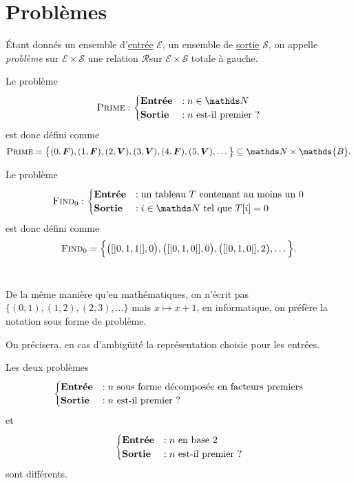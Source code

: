 \section{Problèmes}

\begin{defn}
	Étant donnés un ensemble d'\ul{entrée} $\mathcal{E}$, un ensemble de \ul{sortie} $\mathcal{S}$, on appelle \textit{problème} sur $\mathcal{E} \times \mathcal{S}$\/ une relation $\mathcal{R}$\/\:\footnotemark sur $\mathcal{E} \times \mathcal{S}$\/ totale à gauche.
\end{defn}

\begin{exm}
	Le problème \[
		\text{\textsc{Prime}} : \begin{cases}
			\text{\textbf{Entrée}} &: n \in \N\\
			\text{\textbf{Sortie}} &: n\text{ est-il premier ?}
		\end{cases}
	\] est donc défini comme \[
		\text{\textsc{Prime}} = \big\{(0, \mathbf{F}), (1, \mathbf{F}), (2, \mathbf{V}), (3, \mathbf{V}), (4, \mathbf{F}), (5, \mathbf{V}), \ldots\big\} \subseteq \N\times \mathds{B}
	.\]
\end{exm}

\begin{exm}
	Le problème \[
		\text{\textsc{Find}\textsubscript0} : \begin{cases}
			\text{\textbf{Entrée}} &: \text{un tableau } T \text{ contenant au moins un } 0\\
			\text{\textbf{Sortie}} &: i \in \N \text{ tel que } T[i] = 0
		\end{cases}
	\] est donc défini comme \[
		\text{\textsc{Find}\textsubscript0} = \Big\{\big([|0,1,1|],0\big), \big([|0, 1, 0|], 0\big), \big([|0,1,0|], 2\big),\ldots\Big\}
	.\]~
\end{exm}

\begin{rmk}
	De la même manière qu'en mathématiques, on n'écrit pas $\big\{(0,1),(1,2),(2,3),\ldots\big\}$\/ mais $x \mapsto x+1$, en informatique, on préfère la notation sous forme de problème.
\end{rmk}

\begin{rmk}
	On précisera, en cas d'ambigüité la représentation choisie pour les entrées.
\end{rmk}

\begin{exm}
	Les deux problèmes \[
		\begin{cases}
			\text{\textbf{Entrée}} &: n \text{ sous forme décomposée en facteurs premiers}\\
			\text{\textbf{Sortie}} &: n \text{ est-il premier ?}
		\end{cases}
	\] et \[
		\begin{cases}
			\text{\textbf{Entrée}} &: n \text{ en base 2}\\
			\text{\textbf{Sortie}} &: n \text{ est-il premier ?}
		\end{cases}
	\] sont différents.
\end{exm}

